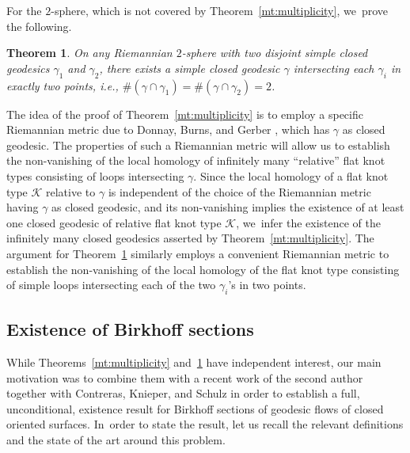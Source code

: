 \documentclass[11pt]{article}
\newcommand{\ie}{i.e.,\xspace}
\newcommand{\KK}{\mathcal{K}}
\theoremstyle{plain}
\newtheorem{MainThm}{Theorem}
\theoremstyle{definition}
\begin{document}
For the $2$-sphere, which is not covered by Theorem~\ref{mt:multiplicity}, we~prove the following.

\begin{MainThm}\label{mt:sphere}
On any Riemannian $2$-sphere with two disjoint simple closed geodesics $\gamma_1$ and $\gamma_2$, there exists a simple closed geodesic $\gamma$ intersecting each $\gamma_i$ in exactly two points, \ie
$\# (\gamma\cap\gamma_1) = \#(\gamma\cap\gamma_2)=2$.
\end{MainThm}

The idea of the proof of Theorem~\ref{mt:multiplicity} is to employ a specific Riemannian metric due to Donnay, Burns, and Gerber \cite{Donnay:1988ab, Burns:1989aa}, which has $\gamma$ as closed geodesic. The properties of such a Riemannian metric will allow us to establish the non-vanishing of the local homology of infinitely many ``relative'' flat knot types consisting of loops intersecting $\gamma$. Since the local homology of a flat knot type $\KK$ relative to $\gamma$ is independent of the choice of the Riemannian metric having $\gamma$ as closed geodesic, and its non-vanishing implies the existence of at least one closed geodesic of relative flat knot type $\KK$, we~infer the existence of the infinitely many closed geodesics asserted by Theorem~\ref{mt:multiplicity}. The argument for Theorem~\ref{mt:sphere} similarly employs a convenient Riemannian metric to establish the non-vanishing of the local homology of the flat knot type consisting of simple loops intersecting each of the two $\gamma_i$'s in two points.

\subsection{Existence of Birkhoff sections}

While Theorems~\ref{mt:multiplicity} and~\ref{mt:sphere} have independent interest, our main motivation was to combine them with a recent work of the second author together with Contreras, Knieper, and Schulz \cite{Contreras:2022ab} in order to establish a full, unconditional, existence result for Birkhoff sections of geodesic flows of closed oriented surfaces. In~order to state the result, let us recall the relevant definitions and the state of the art around this problem.
\end{document}
